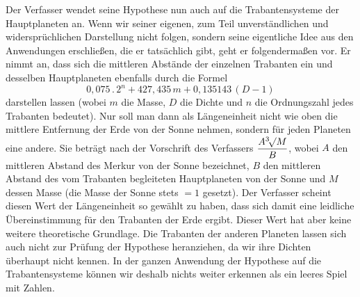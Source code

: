 Der Verfasser wendet seine Hypothese nun auch auf die Trabantensysteme der Hauptplaneten an. Wenn wir seiner eigenen, zum Teil unverständlichen und widersprüchlichen Darstellung nicht folgen, sondern seine eigentliche Idee aus den Anwendungen erschließen, die er tatsächlich gibt, geht er folgendermaßen vor. Er nimmt an, dass sich die mittleren Abstände der einzelnen Trabanten ein und desselben Hauptplaneten ebenfalls durch die Formel
\[ \mathrm{0{,}075} \,.\, 2^n + \mathrm{427{,}435}\, m + \mathrm{0{,}135143}\,(D - \mathrm{1}) \]
darstellen lassen (wobei $m$ die Masse, $D$ die Dichte und $n$ die Ordnungszahl jedes Trabanten bedeutet). Nur soll man dann als Längeneinheit nicht wie oben die mittlere Entfernung der Erde von der Sonne nehmen, sondern für jeden Planeten eine andere. Sie beträgt nach der Vorschrift des Verfassers $\dfrac{A\BareRoot[3]{M}}{B}$, wobei $A$ den mittleren Abstand des Merkur von der Sonne bezeichnet, $B$ den mittleren Abstand des vom Trabanten begleiteten Hauptplaneten von der Sonne und $M$ dessen Masse (die Masse der Sonne stets $= \mathrm{1}$ gesetzt). Der Verfasser scheint diesen Wert der Längeneinheit so gewählt zu haben, dass sich damit eine leidliche Übereinstimmung für den Trabanten der Erde ergibt. Dieser Wert hat aber keine weitere theoretische Grundlage. Die Trabanten der anderen Planeten lassen sich auch nicht zur Prüfung der Hypothese heranziehen, da wir ihre Dichten überhaupt nicht kennen. In der ganzen Anwendung der Hypothese auf die Trabantensysteme können wir deshalb nichts weiter erkennen als ein leeres Spiel mit Zahlen.
